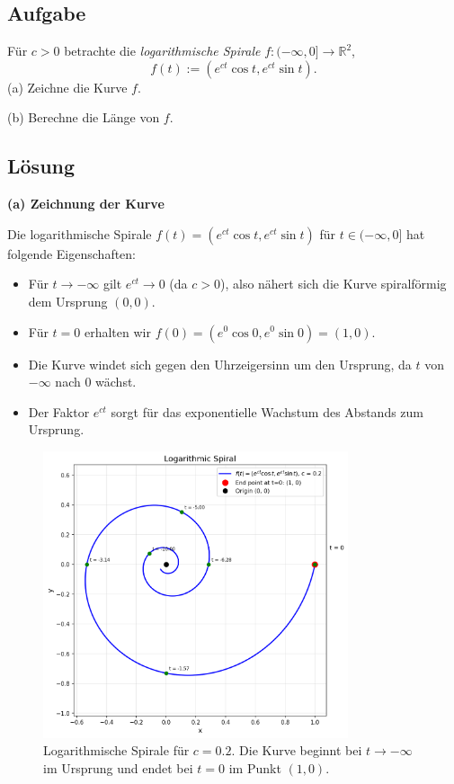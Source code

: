 \documentclass{article}
\begin{document}
\subsection*{Aufgabe}
Für $c>0$ betrachte die \emph{logarithmische Spirale}
$f:(-\infty,0]\to\mathbb{R}^2$,  
$$
   f(t) := (e^{ct}\cos t,e^{ct}\sin t).
$$
(a) Zeichne die Kurve $f$.

(b) Berechne die Länge von $f$.

\subsection*{Lösung}

\textbf{(a) Zeichnung der Kurve}

Die logarithmische Spirale $f(t) = (e^{ct}\cos t, e^{ct}\sin t)$ für $t \in (-\infty, 0]$ hat folgende Eigenschaften:

\begin{itemize}
\item Für $t \to -\infty$ gilt $e^{ct} \to 0$ (da $c > 0$), also nähert sich die Kurve spiralförmig dem Ursprung $(0,0)$.
\item Für $t = 0$ erhalten wir $f(0) = (e^0\cos 0, e^0\sin 0) = (1, 0)$.
\item Die Kurve windet sich gegen den Uhrzeigersinn um den Ursprung, da $t$ von $-\infty$ nach $0$ wächst.
\item Der Faktor $e^{ct}$ sorgt für das exponentielle Wachstum des Abstands zum Ursprung.
\end{itemize}

\begin{figure}[h]
\centering
\includegraphics[width=0.8\textwidth]{logarithmic_spiral_detailed.png}
\caption{Logarithmische Spirale für $c = 0.2$. Die Kurve beginnt bei $t \to -\infty$ im Ursprung und endet bei $t = 0$ im Punkt $(1, 0)$.}
\end{figure}
\end{document}
